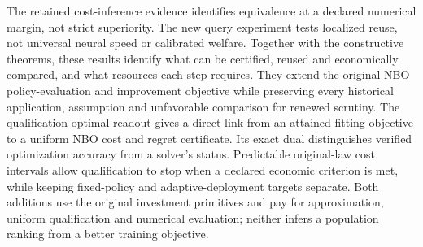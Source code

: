\documentclass[ecta,nameyear,draft]{econsocart}
\begin{document}
The retained cost-inference evidence identifies equivalence at a declared numerical margin, not strict superiority. The new query experiment tests localized reuse, not universal neural speed or calibrated welfare. Together with the constructive theorems, these results identify what can be certified, reused and economically compared, and what resources each step requires. They extend the original NBO policy-evaluation and improvement objective while preserving every historical application, assumption and unfavorable comparison for renewed scrutiny.
The qualification-optimal readout gives a direct link from an attained fitting objective to a uniform NBO cost and regret certificate. Its exact dual distinguishes verified optimization accuracy from a solver's status. Predictable original-law cost intervals allow qualification to stop when a declared economic criterion is met, while keeping fixed-policy and adaptive-deployment targets separate. Both additions use the original investment primitives and pay for approximation, uniform qualification and numerical evaluation; neither infers a population ranking from a better training objective.



\end{document}
